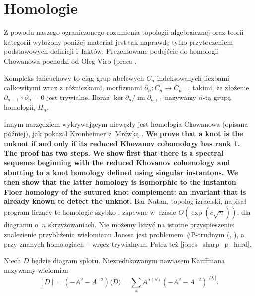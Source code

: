 \section{Homologie} %
\label{sec:homology}
Z powodu naszego ograniczonego rozumienia topologii algebraicznej oraz teorii kategorii
wyłożony poniżej materiał jest tak naprawdę tylko przytoczeniem podstawowych definicji i~faktów.
Prezentowane podejście do homologii Chowanowa pochodzi od Oleg Viro (praca \cite{viro04}.

Kompleks łańcuchowy to ciąg grup abelowych $C_n$ indeksowanych liczbami całkowitymi
wraz z~różniczkami, morfizmami $\partial_n \colon C_n \to C_{n-1}$ takimi,
że złożenie $\partial_{n-1} \circ \partial_n = 0$ jest trywialne.
Iloraz $\ker \partial_n / \operatorname{im} \partial_{n+1}$ nazywamy $n$-tą grupą homologii, $H_n$.

Innym narzędziem wykrywającym niewęzły jest homologia Chowanowa (opisana później),
jak pokazał Kronheimer z~Mrówką \cite{kronheimer11}.
\textbf{We prove that a knot is the unknot if and only if its reduced Khovanov cohomology has rank 1. The proof has two steps. We show first that there is a spectral sequence beginning with the reduced Khovanov cohomology and abutting to a knot homology defined using singular instantons. We then show that the latter homology is isomorphic to the instanton Floer homology of the sutured knot complement: an invariant that is already known to detect the unknot.}
Bar-Natan, topolog izraelski, napisał program liczący te homologie szybko \cite{barnatan07},
zapewne w~czasie $O(\exp(c \sqrt n))$, dla diagramu o~$n$ skrzyżowaniach.
Nie możemy liczyć na istotne przyspieszenie:
znalezienie przybliżenia wielomianu Jonesa jest problemem \#P-trudnym (\cite{kuperberg15}, \cite{vertigan05}),
a przy znanych homologiach -- wręcz trywialnym.
Patrz też \ref{jones_sharp_p_hard}.


\begin{definition}
    Niech $D$ będzie diagram splotu.
    Niezredukowanym nawiasem Kauffmana nazywamy wielomian
    \[
        [D] = (-A^2 - A^{-2}) \langle D \rangle = \sum_s A^{\sigma(s)} (-A^2 - A^{-2})^{|D_s|}.
    \]
\end{definition}

